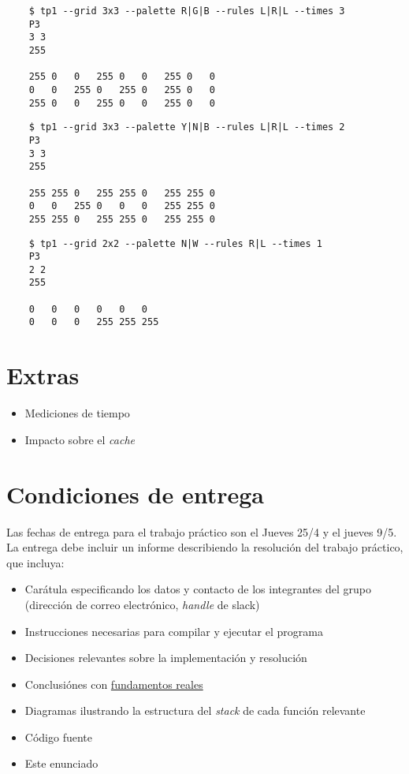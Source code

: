 \documentclass{article}
\begin{document}
    \begin{verbatim}
    $ tp1 --grid 3x3 --palette R|G|B --rules L|R|L --times 3
    P3
    3 3
    255

    255 0   0   255 0   0   255 0   0
    0   0   255 0   255 0   255 0   0 
    255 0   0   255 0   0   255 0   0
    \end{verbatim}

    \begin{verbatim}
    $ tp1 --grid 3x3 --palette Y|N|B --rules L|R|L --times 2
    P3
    3 3
    255

    255 255 0   255 255 0   255 255 0
    0   0   255 0   0   0   255 255 0
    255 255 0   255 255 0   255 255 0
    \end{verbatim}

    \begin{verbatim}
    $ tp1 --grid 2x2 --palette N|W --rules R|L --times 1
    P3
    2 2
    255

    0   0   0   0   0   0 
    0   0   0   255 255 255
    \end{verbatim}

\section{Extras}
\begin{itemize}
\item Mediciones de tiempo
\item Impacto sobre el \textit{cache}
\end{itemize}

\section{Condiciones de entrega}
Las fechas de entrega para el trabajo práctico son el Jueves 25/4 y el jueves 9/5. La entrega debe incluir un informe
describiendo la resolución del trabajo práctico, que incluya:

\begin{itemize}
\item Carátula especificando los datos y contacto de los integrantes del grupo (dirección de correo electrónico, \textit{handle} de slack)
\item Instrucciones necesarias para compilar y ejecutar el programa
\item Decisiones relevantes sobre la implementación y resolución
\item Conclusiónes con \underline{fundamentos reales}
\item Diagramas ilustrando la estructura del \textit{stack} de cada función relevante
\item Código fuente
\item Este enunciado
\end{itemize}
\end{document}
